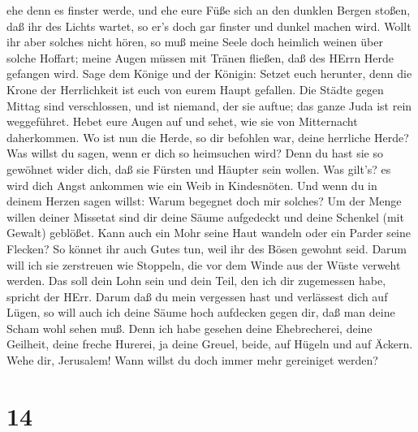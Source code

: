 ehe denn es finster werde, und ehe eure Füße sich an den dunklen Bergen
stoßen, daß ihr des Lichts wartet, so er's doch gar finster und dunkel
machen wird.  Wollt ihr aber solches nicht hören, so muß
meine Seele doch heimlich weinen über solche Hoffart; meine Augen müssen
mit Tränen fließen, daß des HErrn Herde gefangen wird. 
Sage dem Könige und der Königin: Setzet euch herunter, denn die Krone
der Herrlichkeit ist euch von eurem Haupt gefallen.  Die
Städte gegen Mittag sind verschlossen, und ist niemand, der sie auftue;
das ganze Juda ist rein weggeführet.  Hebet eure Augen auf
und sehet, wie sie von Mitternacht daherkommen. Wo ist nun die Herde, so
dir befohlen war, deine herrliche Herde?  Was willst du
sagen, wenn er dich so heimsuchen wird? Denn du hast sie so gewöhnet
wider dich, daß sie Fürsten und Häupter sein wollen. Was gilt's? es wird
dich Angst ankommen wie ein Weib in Kindesnöten.  Und wenn
du in deinem Herzen sagen willst: Warum begegnet doch mir solches? Um
der Menge willen deiner Missetat sind dir deine Säume aufgedeckt und
deine Schenkel (mit Gewalt) geblößet.  Kann auch ein Mohr
seine Haut wandeln oder ein Parder seine Flecken? So könnet ihr auch
Gutes tun, weil ihr des Bösen gewohnt seid.  Darum will ich
sie zerstreuen wie Stoppeln, die vor dem Winde aus der Wüste verweht
werden.  Das soll dein Lohn sein und dein Teil, den ich dir
zugemessen habe, spricht der HErr. Darum daß du mein vergessen hast und
verlässest dich auf Lügen,  so will auch ich deine Säume
hoch aufdecken gegen dir, daß man deine Scham wohl sehen muß.
 Denn ich habe gesehen deine Ehebrecherei, deine Geilheit,
deine freche Hurerei, ja deine Greuel, beide, auf Hügeln und auf Äckern.
Wehe dir, Jerusalem! Wann willst du doch immer mehr gereiniget werden?

\hypertarget{section-13}{%
\section{14}\label{section-13}}

